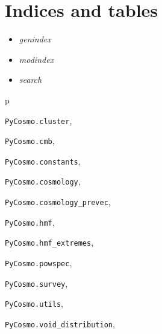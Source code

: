 \documentclass[letterpaper,10pt,english]{sphinxmanual}
\begin{document}
\chapter{Indices and tables}
\label{index:indices-and-tables}\begin{itemize}
\item {} 
\emph{genindex}

\item {} 
\emph{modindex}

\item {} 
\emph{search}

\end{itemize}


\renewcommand{\indexname}{Python Module Index}
\begin{theindex}
\def\bigletter#1{{\Large\sffamily#1}\nopagebreak\vspace{1mm}}
\bigletter{p}
\item {\texttt{PyCosmo.cluster}}, \pageref{PyCosmo:module-PyCosmo.cluster}
\item {\texttt{PyCosmo.cmb}}, \pageref{PyCosmo:module-PyCosmo.cmb}
\item {\texttt{PyCosmo.constants}}, \pageref{PyCosmo:module-PyCosmo.constants}
\item {\texttt{PyCosmo.cosmology}}, \pageref{PyCosmo:module-PyCosmo.cosmology}
\item {\texttt{PyCosmo.cosmology\_prevec}}, \pageref{PyCosmo:module-PyCosmo.cosmology_prevec}
\item {\texttt{PyCosmo.hmf}}, \pageref{PyCosmo:module-PyCosmo.hmf}
\item {\texttt{PyCosmo.hmf\_extremes}}, \pageref{PyCosmo:module-PyCosmo.hmf_extremes}
\item {\texttt{PyCosmo.powspec}}, \pageref{PyCosmo:module-PyCosmo.powspec}
\item {\texttt{PyCosmo.survey}}, \pageref{PyCosmo:module-PyCosmo.survey}
\item {\texttt{PyCosmo.utils}}, \pageref{PyCosmo:module-PyCosmo.utils}
\item {\texttt{PyCosmo.void\_distribution}}, \pageref{PyCosmo:module-PyCosmo.void_distribution}
\end{theindex}

\renewcommand{\indexname}{Index}
\printindex
\end{document}
